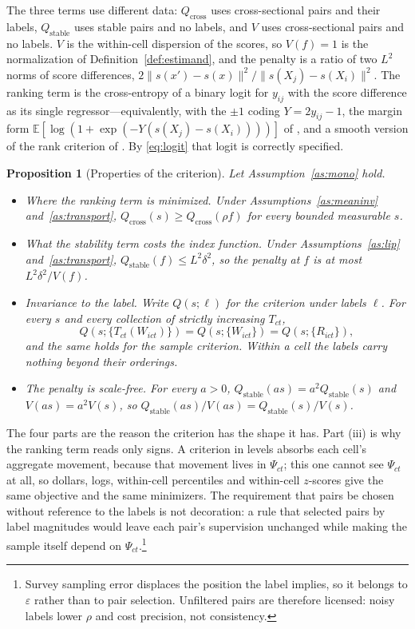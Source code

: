 \documentclass[11pt]{article}
\newtheorem{proposition}{Proposition}
\theoremstyle{remark}
\newcommand{\E}{\mathbb{E}}
\newcommand{\Qc}{Q_{\mathrm{cross}}}
\newcommand{\Qs}{Q_{\mathrm{stable}}}
\newcommand{\Qt}{Q}
\begin{document}
The three terms use different data: $\Qc$ uses cross-sectional pairs and their labels, $\Qs$ uses stable
pairs and no labels, and $V$ uses cross-sectional pairs and no labels. $V$ is the within-cell dispersion
of the scores, so $V(f)=1$ is the normalization of Definition~\ref{def:estimand}, and the penalty is a
ratio of two $L^{2}$ norms of score differences, $2\|s(x')-s(x)\|^{2}/\|s(X_j)-s(X_i)\|^{2}$. The ranking
term is the cross-entropy of a binary logit for $y_{ij}$ with the score difference as its single
regressor---equivalently, with the $\pm1$ coding $Y=2y_{ij}-1$, the margin form
$\E[\log(1+\exp(-Y(s(X_j)-s(X_i))))]$ of \citet{burges2005learning}, and a smooth version of the rank
criterion of \citet{han1987}. By \eqref{eq:logit} that logit is correctly specified.

\begin{proposition}[Properties of the criterion]\label{prop:criterion}
Let Assumption~\ref{as:mono} hold.
\begin{itemize}
\item[\textbf{(i)}] \emph{Where the ranking term is minimized.} Under Assumptions~\ref{as:meaninv}
and~\ref{as:transport}, $\Qc(s) \ge \Qc(\rho f)$ for every bounded measurable $s$.
\item[\textbf{(ii)}] \emph{What the stability term costs the index function.} Under
Assumptions~\ref{as:lip} and~\ref{as:transport}, $\Qs(f) \le L^{2}\delta^{2}$, so the penalty at $f$ is
at most $L^{2}\delta^{2}/V(f)$.
\item[\textbf{(iii)}] \emph{Invariance to the label.} Write $\Qt(s;\ell)$ for the criterion under labels
$\ell$. For every $s$ and every collection of strictly increasing $T_{ct}$,
\[
    \Qt\!\left(s; \{T_{ct}(W_{ict})\}\right)
    = \Qt\!\left(s; \{W_{ict}\}\right)
    = \Qt\!\left(s; \{R_{ict}\}\right),
\]
and the same holds for the sample criterion. Within a cell the labels carry nothing beyond their
orderings.
\item[\textbf{(iv)}] \emph{The penalty is scale-free.} For every $a>0$, $\Qs(as) = a^{2}\Qs(s)$ and
$V(as) = a^{2}V(s)$, so $\Qs(as)/V(as) = \Qs(s)/V(s)$.
\end{itemize}
\end{proposition}

The four parts are the reason the criterion has the shape it has. Part (iii) is why the ranking term
reads only signs. A criterion in levels absorbs each cell's aggregate movement, because that movement
lives in $\Psi_{ct}$; this one cannot see $\Psi_{ct}$ at all, so dollars, logs, within-cell percentiles
and within-cell $z$-scores give the same objective and the same minimizers. The requirement that pairs
be chosen without reference to the labels is not decoration: a rule that selected pairs by label
magnitudes would leave each pair's supervision unchanged while making the sample itself depend on
$\Psi_{ct}$.\footnote{Survey sampling error displaces the position the label implies, so it belongs to
$\varepsilon$ rather than to pair selection. Unfiltered pairs are therefore licensed: noisy labels lower
$\rho$ and cost precision, not consistency.}
\end{document}
